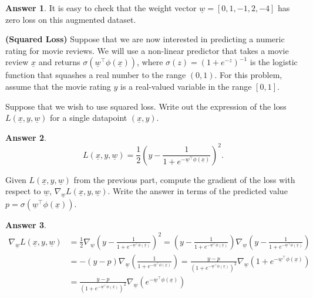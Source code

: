 \documentclass{article}
\renewcommand{\vec}[1]{\underline{#1}}
\newcommand{\vecw}{\vec{w}}
\theoremstyle{definition}
\newtheorem*{answer}{Answer}
\begin{document}
\begin{question}
\begin{question}
\begin{answer}
			It is easy to check that the weight vector $\underline{w} = [0, 1, -1, 2, -4]$ has zero loss on this augmented dataset.
		\end{answer}
	\end{question}
	
	\item \textbf{(Squared Loss)} Suppose that we are now interested in predicting a numeric rating for movie reviews. We will use a non-linear predictor that takes a movie review $\underline{x}$ and returns $\sigma(\underline{w}^\top\phi(\underline{x}))$, where $\sigma(z)=(1+e^{-z})^{-1}$ is the logistic function that squashes a real number to the range $(0,1)$. For this problem, assume that the movie rating $y$ is a real-valued variable in the range $[0,1]$.
	\begin{question}
		\item Suppose that we wish to use squared loss. Write out the expression of the loss $L(\underline{x},y,\underline{w})$ for a single datapoint $(\underline{x},y)$.
		\begin{answer}
			~
			\begin{equation*}
				L(\underline{x},y,\vecw) = \frac{1}{2}\left(y - \frac{1}{1+e^{-\vecw^\top\phi(\underline{x})}}\right)^2.
			\end{equation*}
		\end{answer}
		\item Given $L(\underline{x},y,\underline{w})$ from the previous part, compute the gradient of the loss with respect to $\underline{w}$, $\nabla_{\underline{w}}L(\underline{x},y,\underline{w})$. Write the answer in terms of the predicted value $p=\sigma(\underline{w}^\top\phi(\underline{x}))$.
		\begin{answer}
			~
			\begin{align*}
				\nabla_{\underline{w}}L(\underline{x},y,\underline{w}) &= \frac{1}{2}\nabla_{\underline{w}}\left(y - \frac{1}{1+e^{-\vecw^\top\phi(\underline{x})}}\right)^2 = \left(y - \frac{1}{1+e^{-\vecw^\top\phi(\underline{x})}}\right)\nabla_{\underline{w}}\left(y - \frac{1}{1+e^{-\vecw^\top\phi(\underline{x})}}\right)\\
				&=-(y-p)\nabla_{\underline{w}}\left(\frac{1}{1+e^{-\vecw^\top\phi(\underline{x})}}\right)=\frac{y-p}{\left(1+e^{-\vecw^\top\phi(\underline{x})}\right)^2}\nabla_{\underline{w}}\left(1+e^{-\vecw^\top\phi(\underline{x})} \right)\\
				&=\frac{y-p}{\left(1+e^{-\vecw^\top\phi(\underline{x})}\right)^2}\nabla_{\underline{w}}\left(e^{-\vecw^\top\phi(\underline{x})} \right)\\

\end{align*}
\end{answer}
\end{question}
\end{question}
\end{document}
